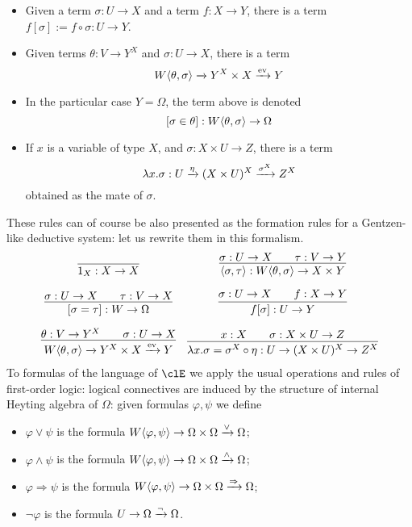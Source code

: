 \begin{definition}
\begin{itemize}
    \item Given a term $\sigma : U \to X$ and a term $f : X \to Y$, there is a term $f[\sigma] := f\circ\sigma : U \to Y$.
    \item Given terms $\theta :  V \to Y^X$ and $\sigma : U\to X$, there is a term
          \[
            W\langle \theta,\sigma\rangle \xrightarrow{}Y^X\times X \xrightarrow{\text{ev}} Y
          \]
    \item In the particular case $Y=\Omega$, the term above is denoted
          \[[\sigma\in\theta] : W\langle \theta,\sigma\rangle \to \Omega\]
    \item If $x$ is a variable of type $X$, and $\sigma : X\times U \to Z$, there is a term
          \[\lambda x.\sigma : U \xrightarrow{\eta} (X\times U)^X \xrightarrow{\sigma^X} Z^X\]
          obtained as the mate of $\sigma$.
  \end{itemize}
  These rules can of course be also presented as the formation rules for a Gentzen-like deductive system: let us rewrite them in this formalism.
  \[ \begin{array}{cc}
      \infer{1_X : X \to X}{}                                                              &
      \infer{\lr{\sigma}{\tau} : W\lr{\theta}{\sigma} \to X \times Y }{\sigma : U \to X    &   & \tau : V \to Y}             \\[1em]
      \infer{[\sigma=\tau] : W \to \Omega}{\sigma : U \to X                                &   & \tau : V \to X}           &
      \infer{f[\sigma] : U \to Y}{\sigma : U \to X                                         &   & f : X \to Y}                \\[1em]
      \infer{W\lr{\theta}{\sigma} \xto{}Y^X\times X \xto{\text{ev}} Y}{\theta :  V \to Y^X &   & \sigma : U\to X}          &
      \infer{\lambda x.\sigma = \sigma^X\circ\eta : U \to (X\times U)^X \to Z^X}{ x: X     &   & \sigma : X\times U \to Z}
    \end{array}\]
  To formulas of the language of $\clE$ we apply the usual operations and rules of first-order logic: logical connectives are induced by the structure of internal Heyting algebra of $\Omega$: given formulas $\varphi,\psi$ we define
  \begin{itemize}
    \item $\varphi\lor \psi$ is the formula $W\langle \varphi,\psi\rangle \to \Omega\times \Omega \xrightarrow{\lor} \Omega$;
    \item $\varphi\land\psi$ is the formula $W\langle \varphi,\psi\rangle \to \Omega\times \Omega \xrightarrow{\land} \Omega$;
    \item $\varphi\Rightarrow\psi$ is the formula $W\langle \varphi,\psi\rangle \to \Omega\times \Omega \xrightarrow{\Rightarrow} \Omega$;
    \item $\lnot\varphi$ is the formula $U \to \Omega \xrightarrow{\lnot} \Omega$.
  \end{itemize}
\end{definition}
